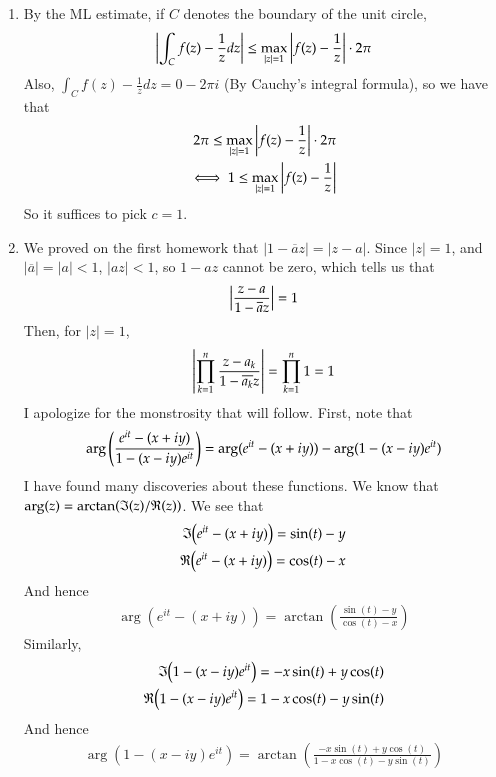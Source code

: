 \documentclass[12pt]{article}
\theoremstyle{definitionstyle}
\renewcommand{\Re}{\mathfrak{R}\qty}
\renewcommand{\Im}{\mathfrak{I}\qty}
\begin{document}
\begin{enumerate}[leftmargin=\labelsep]
		\item By the ML estimate, if $C$ denotes the boundary of the unit circle,
		\begin{align*}
			\qty|\int_C f(z) - \frac1zdz| \leq \max_{|z| = 1} \qty|f(z) - \frac1z| \cdot 2\pi
		\end{align*}
		Also, $\int_C f(z) - \frac1zdz = 0 - 2\pi i$ (By Cauchy's integral formula), so we have that 
		\begin{align*}
			2\pi \leq \max_{|z| = 1} \qty|f(z) - \frac1z| \cdot 2\pi \\
			\iff 1 \leq \max_{|z| = 1} \qty|f(z) - \frac1z|
		\end{align*}
		So it suffices to pick $c = 1$.
		
		\item We proved on the first homework that $|1-\overline{a}z| = |z - a|$. Since $|z| = 1$, and $|\overline{a}| = |a| < 1$, $|az| < 1$, so $1 - az$ cannot be zero, which tells us that 
		\begin{align*}
			\qty|\frac{z-a}{1-\overline{a}z}| = 1
		\end{align*}
		Then, for $|z| = 1$,
		\begin{align*}
			\qty|\prod_{k=1}^n \frac{z-a_k}{1-\overline{a_k}z}| = \prod_{k=1}^n 1 = 1
		\end{align*}
		I apologize for the monstrosity that will follow. First, note that
		\begin{align*}
			\arg\qty(\frac{e^{it}-(x+iy)}{1-(x-iy)e^{it}}) = \arg(e^{it}-(x+iy)) - \arg(1-(x-iy)e^{it})
		\end{align*}
		I have found many discoveries about these functions. We know that $\arg(z) = \arctan(\Im(z)/\Re(z))$. We see that
		\begin{align*}
			\Im(e^{it}-(x+iy)) = \sin(t) - y \\
			\Re(e^{it}-(x+iy)) = \cos(t) - x
		\end{align*}
		And hence 
		\begin{align*}
			\arg(e^{it}-(x+iy)) = \arctan(\frac{\sin(t) - y}{\cos(t) - x})
		\end{align*}
		Similarly, 
		\begin{align*}
			\Im(1-(x-iy)e^{it}) = -x\sin(t)+y\cos(t) \\
			\Re(1-(x-iy)e^{it}) = 1-x\cos(t)-y\sin(t)
		\end{align*}
		And hence 
		\begin{align*}
			\arg(1-(x-iy)e^{it}) = \arctan(\frac{-x\sin(t)+y\cos(t)}{1-x\cos(t)-y\sin(t)})
		\end{align*}

\end{enumerate}
\end{document}
